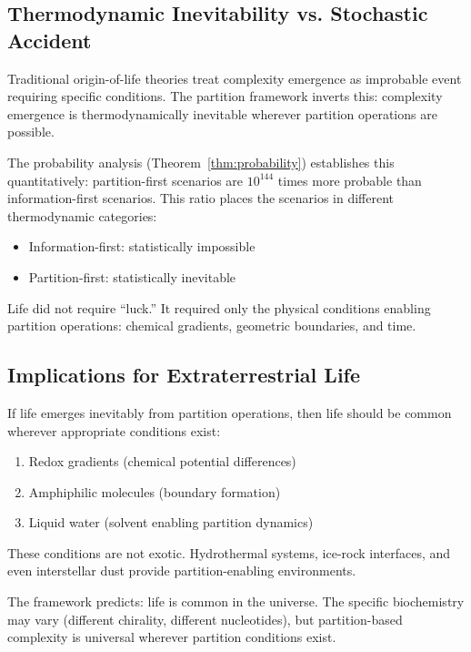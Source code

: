 \documentclass[twocolumn,10pt,a4paper]{article}
\theoremstyle{definition}
\theoremstyle{remark}
\begin{document}
\subsection{Thermodynamic Inevitability vs. Stochastic Accident}

Traditional origin-of-life theories treat complexity emergence as improbable event requiring specific conditions. The partition framework inverts this: complexity emergence is thermodynamically inevitable wherever partition operations are possible.

The probability analysis (Theorem~\ref{thm:probability}) establishes this quantitatively: partition-first scenarios are $10^{144}$ times more probable than information-first scenarios. This ratio places the scenarios in different thermodynamic categories:
\begin{itemize}
    \item Information-first: statistically impossible
    \item Partition-first: statistically inevitable
\end{itemize}

Life did not require ``luck.'' It required only the physical conditions enabling partition operations: chemical gradients, geometric boundaries, and time.

\subsection{Implications for Extraterrestrial Life}

If life emerges inevitably from partition operations, then life should be common wherever appropriate conditions exist:
\begin{enumerate}
    \item Redox gradients (chemical potential differences)
    \item Amphiphilic molecules (boundary formation)
    \item Liquid water (solvent enabling partition dynamics)
\end{enumerate}

These conditions are not exotic. Hydrothermal systems, ice-rock interfaces, and even interstellar dust provide partition-enabling environments.

The framework predicts: life is common in the universe. The specific biochemistry may vary (different chirality, different nucleotides), but partition-based complexity is universal wherever partition conditions exist.
\end{document}
